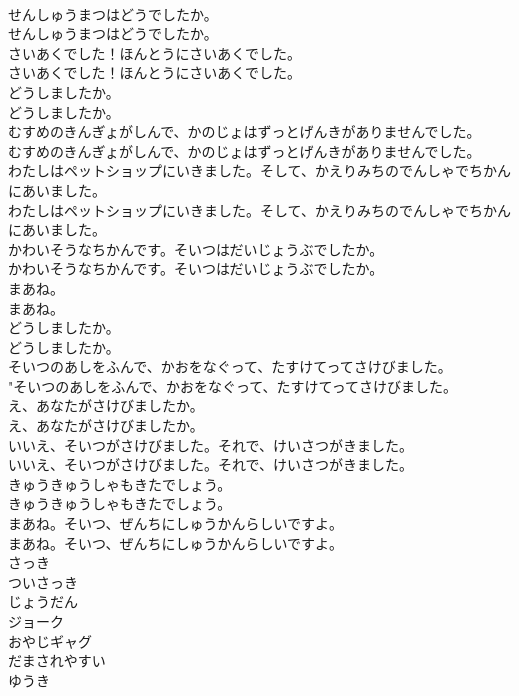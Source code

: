 \documentclass[8pt]{extreport}
\begin{document}
\begin{CJK}{UTF8}{min}
\\	せんしゅうまつはどうでしたか。	
\\	せんしゅうまつはどうでしたか。 
\\	さいあくでした！ほんとうにさいあくでした。	
\\	さいあくでした！ほんとうにさいあくでした。 
\\	どうしましたか。	
\\	どうしましたか。 
\\	むすめのきんぎょがしんで、かのじょはずっとげんきがありませんでした。	
\\	むすめのきんぎょがしんで、かのじょはずっとげんきがありませんでした。 
\\	わたしはペットショップにいきました。そして、かえりみちのでんしゃでちかんにあいました。	
\\	わたしはペットショップにいきました。そして、かえりみちのでんしゃでちかんにあいました。 
\\	かわいそうなちかんです。そいつはだいじょうぶでしたか。	
\\	かわいそうなちかんです。そいつはだいじょうぶでしたか。 
\\	まあね。	
\\	まあね。 
\\	どうしましたか。	
\\	どうしましたか。 
\\	そいつのあしをふんで、かおをなぐって、たすけてってさけびました。	
\\	"そいつのあしをふんで、かおをなぐって、たすけてってさけびました。 
\\	え、あなたがさけびましたか。	
\\	え、あなたがさけびましたか。 
\\	いいえ、そいつがさけびました。それで、けいさつがきました。	
\\	いいえ、そいつがさけびました。それで、けいさつがきました。 
\\	きゅうきゅうしゃもきたでしょう。	
\\	きゅうきゅうしゃもきたでしょう。 
\\	まあね。そいつ、ぜんちにしゅうかんらしいですよ。	
\\	まあね。そいつ、ぜんちにしゅうかんらしいですよ。 
\\	さっき
\\	ついさっき
\\	じょうだん
\\	ジョーク
\\	おやじギャグ
\\	だまされやすい
\\	ゆうき

\end{CJK}
\end{document}
